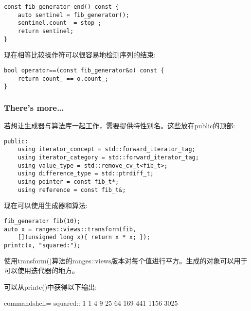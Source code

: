 \begin{lstlisting}[style=styleCXX]
const fib_generator end() const {
	auto sentinel = fib_generator();
	sentinel.count_ = stop_;
	return sentinel;
}
\end{lstlisting}

现在相等比较操作符可以很容易地检测序列的结束:

\begin{lstlisting}[style=styleCXX]
bool operator==(const fib_generator&o) const {
	return count_ == o.count_;
}
\end{lstlisting}

\subsubsection{There's more…}

若想让生成器与算法库一起工作，需要提供特性别名。这些放在public的顶部:

\begin{lstlisting}[style=styleCXX]
public:
	using iterator_concept = std::forward_iterator_tag;
	using iterator_category = std::forward_iterator_tag;
	using value_type = std::remove_cv_t<fib_t>;
	using difference_type = std::ptrdiff_t;
	using pointer = const fib_t*;
	using reference = const fib_t&;
\end{lstlisting}

现在可以使用生成器和算法:

\begin{lstlisting}[style=styleCXX]
fib_generator fib(10);
auto x = ranges::views::transform(fib,
	[](unsigned long x){ return x * x; });
printc(x, "squared:");
\end{lstlisting}

使用transform()算法的ranges::views版本对每个值进行平方。生成的对象可以用于可以使用迭代器的地方。

可以从printc()中获得以下输出:

\begin{tcblisting}{commandshell={}}
squared:: 1 1 4 9 25 64 169 441 1156 3025
\end{tcblisting}


